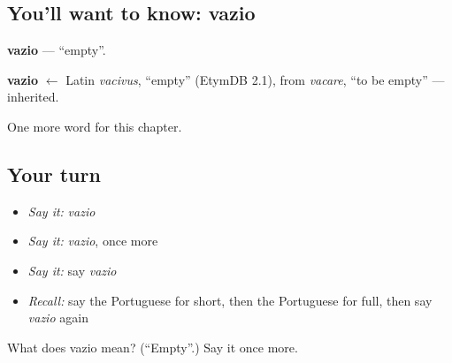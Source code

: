 \subsection*{You'll want to know: vazio}
\textbf{vazio} — \textquotedblleft{}empty\textquotedblright{}.

\begin{cousinweb}
\textbf{vazio} $\leftarrow$ Latin \emph{vacivus}, \textquotedblleft{}empty\textquotedblright{} (EtymDB 2.1), from \emph{vacare}, \textquotedblleft{}to be empty\textquotedblright{} — inherited.
\end{cousinweb}

\begin{grammarlens}[title={What you've built}]
One more word for this chapter.
\end{grammarlens}

\subsection*{Your turn}
\begin{itemize}
\raggedright
  \item \emph{Say it:} \emph{vazio}
  \item \emph{Say it:} \emph{vazio}, once more
  \item \emph{Say it:} say \emph{vazio}
  \item \emph{Recall:} say the Portuguese for short, then the Portuguese for full, then say \emph{vazio} again
\end{itemize}

\begin{tcolorbox}[breakable,colback=teal!4,colframe=teal!35!black,title={Before you move on}]
What does vazio mean? (\textquotedblleft{}Empty\textquotedblright{}.) Say it once more.
\end{tcolorbox}
